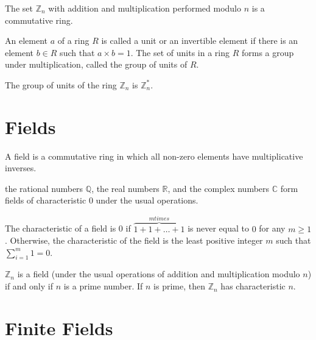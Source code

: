 \begin{myexample}
	The set $\mathbb{Z}_n$ with addition and multiplication performed modulo $n$ is a commutative ring.
\end{myexample}

\begin{mydef} 
	An element $a$ of a ring $R$ is called a unit or an invertible element if there is an element $b \in R $ such that $a \times b = 1$. 
	The set of units in a ring $R$ forms a group under multiplication, called the group of units of $R$.
\end{mydef}

\begin{myexample} 
	The group of units of the ring $\mathbb{Z}_n$ is $\mathbb{Z}_n^*$. 
\end{myexample}


\section{Fields}

\begin{mydef} 
	A field is a commutative ring in which all non-zero elements have multiplicative inverses.  
\end{mydef}

\begin{myexample} 
	the rational numbers $\mathbb{Q}$, the real numbers $\mathbb{R}$, and the complex numbers $\mathbb{C}$ form fields of characteristic $0$ under the usual operations. 
\end{myexample}

\begin{mydef} 
	The characteristic of a field is 0 if $\overbrace{1+1+\dots+1}^{m times}$ is never equal to $0$ for any $m \geq 1$. Otherwise, the characteristic of the field is the least positive integer $m$ such that $\sum_{i=1}^{m}1 = 0$.
\end{mydef}

\begin{myexample} 
	$\mathbb{Z}_n$ is a field (under the usual operations of addition and multiplication modulo $n$) if and only if $n$ is a prime number. If $n$ is prime, then $\mathbb{Z}_n$ has characteristic $n$. 
\end{myexample}

\section{Finite Fields}

